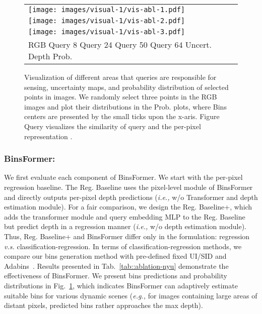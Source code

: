\documentclass[runningheads]{llncs}
\begin{document}
\begin{figure}[t]
    \centering
    \footnotesize
    \begin{tabular}{l}
        \texttt{[image: images/visual-1/vis-abl-1.pdf]} \vspace{-0.2cm}\\
        \texttt{[image: images/visual-1/vis-abl-2.pdf]} \vspace{-0.2cm}\\
\texttt{[image: images/visual-1/vis-abl-3.pdf]} \\
        \hspace{0.03\linewidth}RGB
        \hspace{0.03\linewidth}Query 8
        \hspace{0.01\linewidth}Query 24
        \hspace{0.002\linewidth}Query 50
        \hspace{0.002\linewidth}Query 64
        \hspace{0.012\linewidth}Uncert.
        \hspace{0.03\linewidth}Depth
        \hspace{0.05\linewidth}Prob.\\
    \end{tabular}
    \caption{Visualization of different areas that queries are responsible for sensing, uncertainty maps, and probability distribution of selected points in images. We randomly select three points in the RGB images and plot their distributions in the Prob. plots, where Bins centers are presented by the small ticks upon the x-aris. Figure Query  visualizes the similarity of  query and the per-pixel representation .}
    \label{fig::visual-1}
\end{figure}

\subsubsection{BinsFormer:} We first evaluate each component of BinsFormer. We start with the per-pixel regression baseline. The Reg. Baseline uses the pixel-level module of BinsFormer and directly outputs per-pixel depth predictions (\textit{i.e.,} w/o Transformer and depth estimation module). For a fair comparison, we design the Reg. Baseline+, which adds the transformer module and query embedding MLP to the Reg. Baseline but predict depth in a regression manner (\textit{i.e.,} w/o depth estimation module). Thus, Reg. Baseline+ and BinsFormer differ only in the formulation: regression \textit{v.s.} classification-regression. In terms of classification-regression methods, we compare our bins generation method with pre-defined fixed UI/SID and Adabins~\cite{bhat2021adabins}. Results presented in Tab.~\ref{tab::ablation-nyu} demonstrate the effectiveness of BinsFormer. We present bins predictions and probability distributions in Fig.~\ref{fig::visual-1}, which indicates BinsFormer can adaptively estimate suitable bins for various dynamic scenes (\textit{e.g.,} for images containing large areas of distant pixels, predicted bins rather approaches the max depth). 
\end{document}
